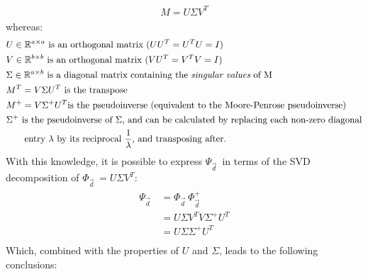 \documentclass[11pt]{scrartcl} %
\begin{document}
  \begin{align*}
    \begin{aligned}
      M = U\Sigma V^T
    \end{aligned}
  \end{align*}
  whereas:
  \begin{align*}
    \begin{aligned}
      &U\in\mathbb{R}^{a\times a} \text{ is an orthogonal matrix } (U U^T = U^TU = I)\\
      &V\in\mathbb{R}^{b\times b} \text{ is an orthogonal matrix } (V U^T = V^TV =I)\\
      &\Sigma\in\mathbb{R}^{a\times b} \text{ is a diagonal matrix containing the {\it singular values} of M}\\
      &M^T = V\Sigma U^T \text{ is the transpose}\\
      &M^+ = V\Sigma^+ U^T \text{is the pseudoinverse (equivalent to the Moore-Penrose pseudoinverse)}\\
      &\Sigma^+ \text{ is the pseudoinverse of \(\Sigma\), and can be calculated by replacing each non-zero diagonal}\\
      &\quad\quad\text{entry \(\lambda\) by its reciprocal \(\frac{1}{\lambda}\), and transposing after.}
    \end{aligned}
  \end{align*}
  With this knowledge, it is possible to express \( \Psi_{\vec{d}\;}\) in terms of the SVD decomposition of \( \Phi_{\vec{d}\;} = U\Sigma V^T\):
  \begin{align*}
    \begin{aligned}
      \Psi_{\vec{d}\;} &= \Phi_{\vec{d}\;} \Phi_{\vec{d}\;}^+\\
      &= U\Sigma V^T V\Sigma^+ U^T\\
      &= U\Sigma \Sigma^+ U^T\\
    \end{aligned}
  \end{align*}
  Which, combined with the properties of \(U\) and \(\Sigma\), leads to the following conclusions:
\end{document}
